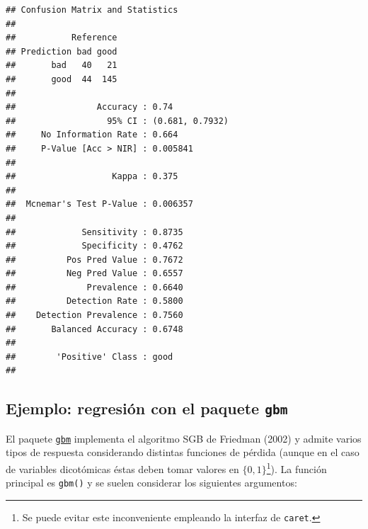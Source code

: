 \documentclass[
]{book}
\newenvironment{Shaded}{\begin{snugshade}}{\end{snugshade}}
\newcommand{\AttributeTok}[1]{\textcolor[rgb]{0.77,0.63,0.00}{#1}}
\newcommand{\FunctionTok}[1]{\textcolor[rgb]{0.00,0.00,0.00}{#1}}
\newcommand{\NormalTok}[1]{#1}
\newcommand{\SpecialCharTok}[1]{\textcolor[rgb]{0.00,0.00,0.00}{#1}}
\newcommand{\StringTok}[1]{\textcolor[rgb]{0.31,0.60,0.02}{#1}}
\theoremstyle{break}
\theoremstyle{definition}
\theoremstyle{definition}
\theoremstyle{definition}
\theoremstyle{definition}
\theoremstyle{remark}
\begin{document}
\begin{Shaded}
\end{Shaded}

\begin{verbatim}
## Confusion Matrix and Statistics
## 
##           Reference
## Prediction bad good
##       bad   40   21
##       good  44  145
##                                          
##                Accuracy : 0.74           
##                  95% CI : (0.681, 0.7932)
##     No Information Rate : 0.664          
##     P-Value [Acc > NIR] : 0.005841       
##                                          
##                   Kappa : 0.375          
##                                          
##  Mcnemar's Test P-Value : 0.006357       
##                                          
##             Sensitivity : 0.8735         
##             Specificity : 0.4762         
##          Pos Pred Value : 0.7672         
##          Neg Pred Value : 0.6557         
##              Prevalence : 0.6640         
##          Detection Rate : 0.5800         
##    Detection Prevalence : 0.7560         
##       Balanced Accuracy : 0.6748         
##                                          
##        'Positive' Class : good           
## 
\end{verbatim}

\hypertarget{ejemplo-regresiuxf3n-con-el-paquete-gbm}{%
\subsection{\texorpdfstring{Ejemplo: regresión con el paquete \texttt{gbm}}{Ejemplo: regresión con el paquete gbm}}\label{ejemplo-regresiuxf3n-con-el-paquete-gbm}}

El paquete \href{https://CRAN.R-project.org/package=gbm}{\texttt{gbm}} implementa el algoritmo SGB de Friedman (2002) y admite varios tipos de respuesta considerando distintas funciones de pérdida (aunque en el caso de variables dicotómicas éstas deben tomar valores en \(\{0, 1\}\)\footnote{Se puede evitar este inconveniente empleando la interfaz de \texttt{caret}.}).
La función principal es \texttt{gbm()} y se suelen considerar los siguientes argumentos:
\end{document}
